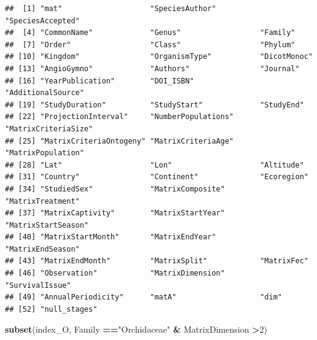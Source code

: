 \documentclass[
]{book}
\newenvironment{Shaded}{\begin{snugshade}}{\end{snugshade}}
\newcommand{\DecValTok}[1]{\textcolor[rgb]{0.00,0.00,0.81}{#1}}
\newcommand{\FunctionTok}[1]{\textcolor[rgb]{0.13,0.29,0.53}{\textbf{#1}}}
\newcommand{\NormalTok}[1]{#1}
\newcommand{\SpecialCharTok}[1]{\textcolor[rgb]{0.81,0.36,0.00}{\textbf{#1}}}
\newcommand{\StringTok}[1]{\textcolor[rgb]{0.31,0.60,0.02}{#1}}
\theoremstyle{definition}
\theoremstyle{definition}
\theoremstyle{definition}
\theoremstyle{definition}
\theoremstyle{remark}
\begin{document}
\begin{verbatim}
##  [1] "mat"                    "SpeciesAuthor"          "SpeciesAccepted"       
##  [4] "CommonName"             "Genus"                  "Family"                
##  [7] "Order"                  "Class"                  "Phylum"                
## [10] "Kingdom"                "OrganismType"           "DicotMonoc"            
## [13] "AngioGymno"             "Authors"                "Journal"               
## [16] "YearPublication"        "DOI_ISBN"               "AdditionalSource"      
## [19] "StudyDuration"          "StudyStart"             "StudyEnd"              
## [22] "ProjectionInterval"     "NumberPopulations"      "MatrixCriteriaSize"    
## [25] "MatrixCriteriaOntogeny" "MatrixCriteriaAge"      "MatrixPopulation"      
## [28] "Lat"                    "Lon"                    "Altitude"              
## [31] "Country"                "Continent"              "Ecoregion"             
## [34] "StudiedSex"             "MatrixComposite"        "MatrixTreatment"       
## [37] "MatrixCaptivity"        "MatrixStartYear"        "MatrixStartSeason"     
## [40] "MatrixStartMonth"       "MatrixEndYear"          "MatrixEndSeason"       
## [43] "MatrixEndMonth"         "MatrixSplit"            "MatrixFec"             
## [46] "Observation"            "MatrixDimension"        "SurvivalIssue"         
## [49] "AnnualPeriodicity"      "matA"                   "dim"                   
## [52] "null_stages"
\end{verbatim}

\begin{Shaded}
\begin{Highlighting}[]
\FunctionTok{subset}\NormalTok{(index\_O, Family }\SpecialCharTok{==}\StringTok{"Orchidaceae"}  \SpecialCharTok{\&}
\NormalTok{             MatrixDimension }\SpecialCharTok{\textgreater{}}\DecValTok{2}\NormalTok{)}
\end{Highlighting}
\end{Shaded}
\end{document}
